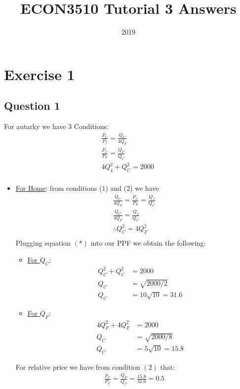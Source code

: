 \documentclass{article}
\title{ECON3510 Tutorial 3 Answers}
\date{2019}
\begin{document}
\maketitle

\section{Exercise 1}
\vspace{6mm}
\subsection{Question 1}

For autarky we have 3 Conditions:
\begin{gather*}
  \tfrac{P_{C}}{P_{f}} = \tfrac{Q_{C}}{4Q_{F}} \ \tag{1} \\
  \tfrac{P_{C}}{P_{F}} = \tfrac{Q_{F}}{Q_{C}} \ \tag{2} \\
  4Q_{4}^{2} + Q_{C}^{2} = 2000 \ \tag{3} \\
\end{gather*}

\begin{itemize}
  \item  \underline{For Home}: from conditions (1) and (2) we have
  \begin{gather*}
    \tfrac{Q_{C}}{4Q_{F}} = \tfrac{P_{C}}{P_{F}} = \tfrac{Q_{f}}{Q_{C}} \\
    \tfrac{Q_{C}}{4Q_{F}} = \tfrac{Q_{f}}{Q_{C}} \\
    \therefore Q_{C}^{2} = 4Q_{F}^{2} \ \tag{*} \\
  \end{gather*}
  Plugging equation $(*)$ into our PPF we obtain the following:
  \begin{itemize}
    \item  \underline{For $Q_{C}$}:
    \begin{align*}
      Q_{C}^{2} + Q_{C}^{2} &= 2000 \\
      Q_{C} &= \sqrt{2000/2} \\
      Q_{C} &= 10\sqrt{10} = 31.6
    \end{align*}
    \item  \underline{For $Q_{F}$}:
    \begin{align*}
      4Q_{F}^{2} + 4Q_{F}^{2} &= 2000 \\
      Q_{C} &= \sqrt{2000/8} \\
      Q_{C} &= 5\sqrt{10} = 15.8
    \end{align*}
  \end{itemize}
  For relative price we have from condition $(2)$ that:
  \begin{gather*}
    \tfrac{P_{C}}{P_{F}} = \tfrac{Q_{F}}{Q_{C}} = \tfrac{15.8}{31.6} = 0.5
  \end{gather*}
\end{itemize}
\end{document}
